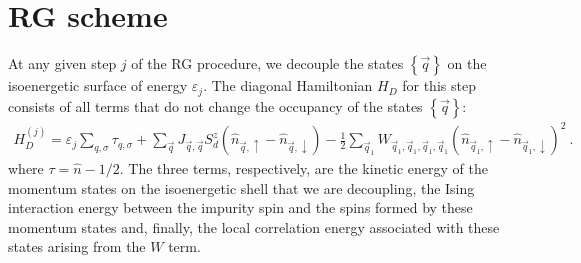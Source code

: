 \documentclass{revtex4-2}
\begin{document}
\section{RG scheme}
At any given step \(j\) of the RG procedure, we decouple the states \(\left\{ \vec q \right\} \) on the isoenergetic surface of energy \(\varepsilon_j\). The diagonal Hamiltonian \(H_D\) for this step consists of all terms that do not change the occupancy of the states \(\left\{\vec q\right\}\):
\begin{equation}\begin{aligned}
	H_D^{(j)} = \varepsilon_j\sum_{q,\sigma}\tau_{q,\sigma} + \sum_{\vec q}J_{\vec q, \vec q}S_d^z\left(\hat n_{\vec q, \uparrow} - \hat n_{\vec q, \downarrow}\right) - \frac{1}{2}\sum_{\vec q_1}W_{\vec q_1, \vec q_1, \vec q_1, \vec q_1}\left(\hat n_{\vec q_1, \uparrow} - \hat n_{\vec q_1, \downarrow}\right)^2~.
\end{aligned}\end{equation}
where \(\tau = \hat n - 1/2\). The three terms, respectively, are the kinetic energy of the momentum states on the isoenergetic shell that we are decoupling, the Ising interaction energy between the impurity spin and the spins formed by these momentum states and, finally, the local correlation energy associated with these states arising from the \(W\) term.
\end{document}
